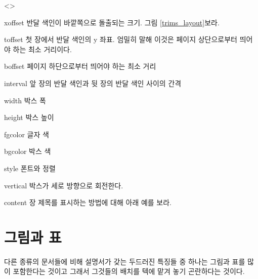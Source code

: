 \documentclass[pairquote, minted]{hzguide}
\begin{document}
\begin{macros}<\ThumbIndexSetup>
\item[xoffset] \keyvalue{0mm}
반달 색인이 바깥쪽으로 돌출되는 크기. 그림 \ref{trims_layout}\을 보라.

\item[toffset] \keyvalue{30mm}
첫 장에서 반달 색인의 y 좌표. 엄밀히 말해 이것은 페이지 상단으로부터 띄어야 하는 최소 거리이다.

\item[boffset] \keyvalue{30mm}
페이지 하단으로부터 띄어야 하는 최소 거리

\item[interval] \keyvalue{5mm}
앞 장의 반달 색인과 뒷 장의 반달 색인 사이의 간격

\item[width] \keyvalue{3em}
박스 폭

\item[height] \keyvalue{2em}
박스 높이 

\item[fgcolor] 
글자 색

\item[bgcolor] 
박스 색

\item[style] \keyvalue{\bfseries\centering}
폰트와 정렬

\item[vertical] \keyvalueTF
박스가 세로 방향으로 회전한다.

\item[content] \keyvalue{\thechapter}
장 제목를 표시하는 방법에 대해 아래 예를 보라.
\end{macros}

\begin{code}
\end{code}

\ClearWatermark

\chapter{그림과 표}

\noindent 다른 종류의 문서들에 비해 설명서가 갖는 두드러진 특징들 중 하나는 그림과 표를 많이 포함한다는 것이고 그래서 그것들의 배치를 텍에 맡겨 놓기 곤란하다는 것이다.
\end{document}
